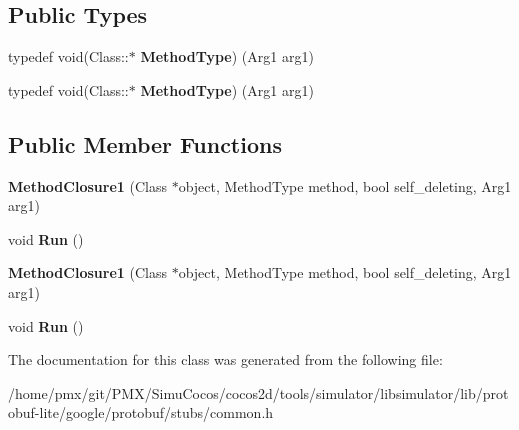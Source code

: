 \subsection*{Public Types}
\begin{DoxyCompactItemize}
\item 
\mbox{\label{classgoogle_1_1protobuf_1_1internal_1_1MethodClosure1_ac9ad4ec03e2d4564d72f576bf6ba9e05}} 
typedef void(Class\+::$\ast$ {\bfseries Method\+Type}) (Arg1 arg1)
\item 
\mbox{\label{classgoogle_1_1protobuf_1_1internal_1_1MethodClosure1_ac9ad4ec03e2d4564d72f576bf6ba9e05}} 
typedef void(Class\+::$\ast$ {\bfseries Method\+Type}) (Arg1 arg1)
\end{DoxyCompactItemize}
\subsection*{Public Member Functions}
\begin{DoxyCompactItemize}
\item 
\mbox{\label{classgoogle_1_1protobuf_1_1internal_1_1MethodClosure1_aafa4319dc45cb9af13e9d66f0f410cc4}} 
{\bfseries Method\+Closure1} (Class $\ast$object, Method\+Type method, bool self\+\_\+deleting, Arg1 arg1)
\item 
\mbox{\label{classgoogle_1_1protobuf_1_1internal_1_1MethodClosure1_afa146e65072dec6b664d06656cd69171}} 
void {\bfseries Run} ()
\item 
\mbox{\label{classgoogle_1_1protobuf_1_1internal_1_1MethodClosure1_aafa4319dc45cb9af13e9d66f0f410cc4}} 
{\bfseries Method\+Closure1} (Class $\ast$object, Method\+Type method, bool self\+\_\+deleting, Arg1 arg1)
\item 
\mbox{\label{classgoogle_1_1protobuf_1_1internal_1_1MethodClosure1_afa146e65072dec6b664d06656cd69171}} 
void {\bfseries Run} ()
\end{DoxyCompactItemize}


The documentation for this class was generated from the following file\+:\begin{DoxyCompactItemize}
\item 
/home/pmx/git/\+P\+M\+X/\+Simu\+Cocos/cocos2d/tools/simulator/libsimulator/lib/protobuf-\/lite/google/protobuf/stubs/common.\+h\end{DoxyCompactItemize}
